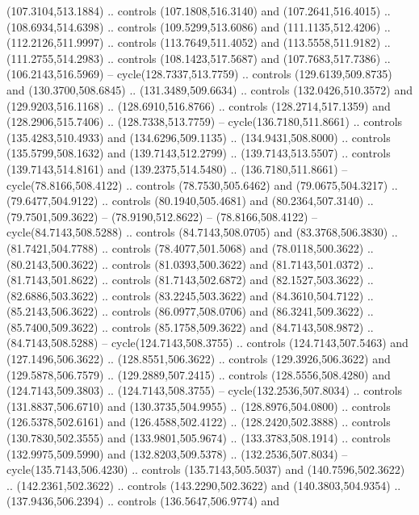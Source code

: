 \begin{scope}[shift={(58.28571,-442.36218)}]
    (107.3104,513.1884) .. controls (107.1808,516.3140) and (107.2641,516.4015) ..
    (108.6934,514.6398) .. controls (109.5299,513.6086) and (111.1135,512.4206) ..
    (112.2126,511.9997) .. controls (113.7649,511.4052) and (113.5558,511.9182) ..
    (111.2755,514.2983) .. controls (108.1423,517.5687) and (107.7683,517.7386) ..
    (106.2143,516.5969) -- cycle(128.7337,513.7759) .. controls
    (129.6139,509.8735) and (130.3700,508.6845) .. (131.3489,509.6634) .. controls
    (132.0426,510.3572) and (129.9203,516.1168) .. (128.6910,516.8766) .. controls
    (128.2714,517.1359) and (128.2906,515.7406) .. (128.7338,513.7759) --
    cycle(136.7180,511.8661) .. controls (135.4283,510.4933) and
    (134.6296,509.1135) .. (134.9431,508.8000) .. controls (135.5799,508.1632) and
    (139.7143,512.2799) .. (139.7143,513.5507) .. controls (139.7143,514.8161) and
    (139.2375,514.5480) .. (136.7180,511.8661) -- cycle(78.8166,508.4122) ..
    controls (78.7530,505.6462) and (79.0675,504.3217) .. (79.6477,504.9122) ..
    controls (80.1940,505.4681) and (80.2364,507.3140) .. (79.7501,509.3622) --
    (78.9190,512.8622) -- (78.8166,508.4122) -- cycle(84.7143,508.5288) ..
    controls (84.7143,508.0705) and (83.3768,506.3830) .. (81.7421,504.7788) ..
    controls (78.4077,501.5068) and (78.0118,500.3622) .. (80.2143,500.3622) ..
    controls (81.0393,500.3622) and (81.7143,501.0372) .. (81.7143,501.8622) ..
    controls (81.7143,502.6872) and (82.1527,503.3622) .. (82.6886,503.3622) ..
    controls (83.2245,503.3622) and (84.3610,504.7122) .. (85.2143,506.3622) ..
    controls (86.0977,508.0706) and (86.3241,509.3622) .. (85.7400,509.3622) ..
    controls (85.1758,509.3622) and (84.7143,508.9872) .. (84.7143,508.5288) --
    cycle(124.7143,508.3755) .. controls (124.7143,507.5463) and
    (127.1496,506.3622) .. (128.8551,506.3622) .. controls (129.3926,506.3622) and
    (129.5878,506.7579) .. (129.2889,507.2415) .. controls (128.5556,508.4280) and
    (124.7143,509.3803) .. (124.7143,508.3755) -- cycle(132.2536,507.8034) ..
    controls (131.8837,506.6710) and (130.3735,504.9955) .. (128.8976,504.0800) ..
    controls (126.5378,502.6161) and (126.4588,502.4122) .. (128.2420,502.3888) ..
    controls (130.7830,502.3555) and (133.9801,505.9674) .. (133.3783,508.1914) ..
    controls (132.9975,509.5990) and (132.8203,509.5378) .. (132.2536,507.8034) --
    cycle(135.7143,506.4230) .. controls (135.7143,505.5037) and
    (140.7596,502.3622) .. (142.2361,502.3622) .. controls (143.2290,502.3622) and
    (140.3803,504.9354) .. (137.9436,506.2394) .. controls (136.5647,506.9774) and

\end{scope}
